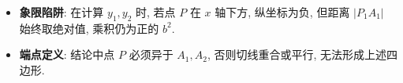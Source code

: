 \begin{trapbox}
\begin{itemize}
    \item \textbf{象限陷阱}: 在计算 $y_1, y_2$ 时, 若点 $P$ 在 $x$ 轴下方, 纵坐标为负, 但距离 $|P_1A_1|$ 始终取绝对值, 乘积仍为正的 $b^2$.
    \item \textbf{端点定义}: 结论中点 $P$ 必须异于 $A_1, A_2$, 否则切线重合或平行, 无法形成上述四边形.
\end{itemize}
\end{trapbox}